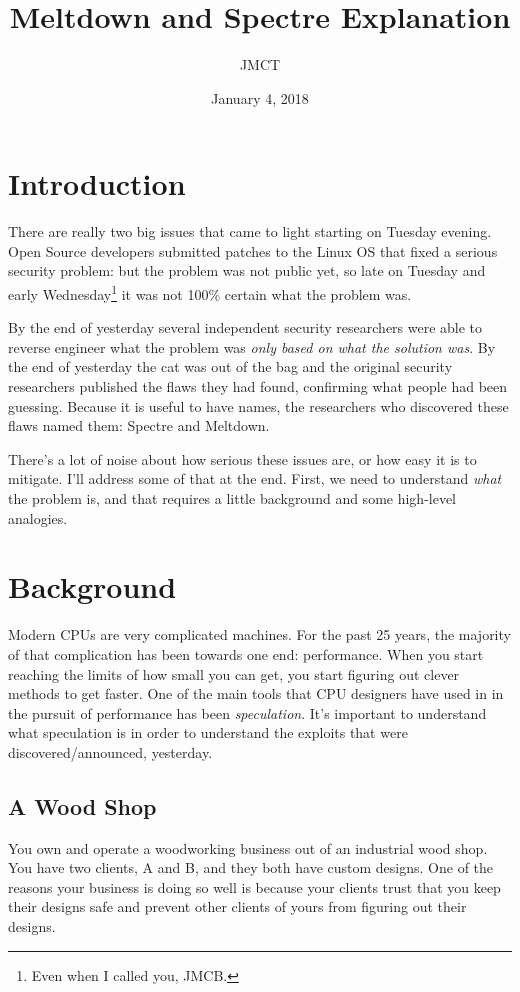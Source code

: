\documentclass{article}
\title{Meltdown and Spectre Explanation}
\author{JMCT}
\date{January 4, 2018}
\begin{document}
\maketitle

\section{Introduction}

There are really two big issues that came to light starting on Tuesday evening.
Open Source developers submitted patches to the Linux OS that fixed a serious
security problem: but the problem was not public yet, so late on Tuesday and
early Wednesday\footnote{Even when I called you, JMCB.} it was not 100\%
certain what the problem was.

By the end of yesterday several independent security researchers were able to
reverse engineer what the problem was \emph{only based on what the solution
was}. By the end of yesterday the cat was out of the bag and the original
security researchers published the flaws they had found, confirming what people
had been guessing. Because it is useful to have names, the researchers who
discovered these flaws named them: Spectre and Meltdown.

There's a lot of noise about how serious these issues are, or how easy it is to
mitigate. I'll address some of that at the end. First, we need to understand
\emph{what} the problem is, and that requires a little background and some
high-level analogies.

\section{Background}

Modern CPUs are very complicated machines. For the past 25 years, the majority
of that complication has been towards one end: performance. When you start
reaching the limits of how small you can get, you start figuring out clever
methods to get faster. One of the main tools that CPU designers have used in in
the pursuit of performance has been \emph{speculation}. It's important to
understand what speculation is in order to understand the exploits that were
discovered/announced, yesterday.

\subsection*{A Wood Shop}

You own and operate a woodworking business out of an industrial wood shop. You
have two clients, A and B, and they both have custom designs. One of the
reasons your business is doing so well is because your clients trust that you
keep their designs safe and prevent other clients of yours from figuring out
their designs.
\end{document}
